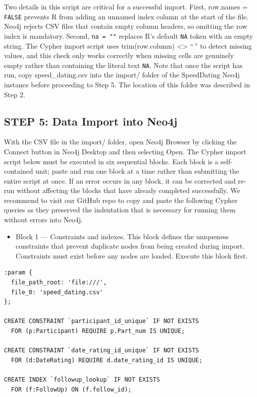 \documentclass[sn-apa,pdflatex]{sn-jnl}
\theoremstyle{remark}
\theoremstyle{definition}
\providecommand{\tightlist}{%
  \setlength{\itemsep}{0pt}\setlength{\parskip}{0pt}}
\begin{document}
Two details in this script are critical for a successful import. First,
row.names = \texttt{FALSE} prevents R from adding an unnamed index
column at the start of the file. Neo4j rejects CSV files that contain
empty column headers, so omitting the row index is mandatory. Second,
\texttt{na\ =\ ""} replaces R's default \texttt{NA} token with an empty
string. The Cypher import script uses trim(row.column)
\textless\textgreater{} ``\,'' to detect missing values, and this check
only works correctly when missing cells are genuinely empty rather than
containing the literal text \texttt{NA}. Note that once the script has
run, copy speed\_dating.csv into the import/ folder of the SpeedDating
Neo4j instance before proceeding to Step 5. The location of this folder
was described in Step 2.

\subsection{STEP 5: Data Import into
Neo4j}\label{step-5-data-import-into-neo4j}

With the CSV file in the import/ folder, open Neo4j Browser by clicking
the Connect button in Neo4j Desktop and then selecting Open. The Cypher
import script below must be executed in six sequential blocks. Each
block is a self-contained unit; paste and run one block at a time rather
than submitting the entire script at once. If an error occurs in any
block, it can be corrected and re-run without affecting the blocks that
have already completed successfully. We recommend to visit our GitHub
repo to copy and paste the following Cypher queries as they preserved
the indentation that is necessary for running them without errors into
Neo4j.

\begin{itemize}
\tightlist
\item
  Block 1 --- Constraints and indexes. This block defines the uniqueness
  constraints that prevent duplicate nodes from being created during
  import. Constraints must exist before any nodes are loaded. Execute
  this block first.
\end{itemize}

\begin{verbatim}
:param {
  file_path_root: 'file:///',
  file_0: 'speed_dating.csv'
};

CREATE CONSTRAINT `participant_id_unique` IF NOT EXISTS
  FOR (p:Participant) REQUIRE p.Part_num IS UNIQUE;

CREATE CONSTRAINT `date_rating_id_unique` IF NOT EXISTS
  FOR (d:DateRating) REQUIRE d.date_rating_id IS UNIQUE;

CREATE INDEX `followup_lookup` IF NOT EXISTS
  FOR (f:FollowUp) ON (f.follow_id);
\end{verbatim}
\end{document}
